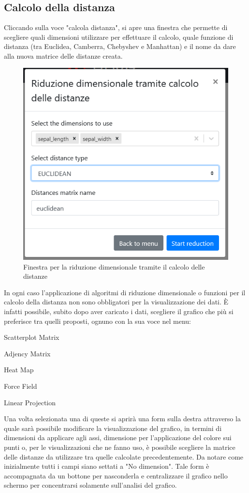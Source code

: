 \subsection{Calcolo della distanza}
Cliccando sulla voce "calcola distanza", si apre una finestra che permette di scegliere quali dimensioni utilizzare per effettuare il calcolo, quale funzione di distanza (tra Euclidea, Camberra, Chebyshev e Manhattan) e il nome da dare alla nuova matrice delle distanze creata.
\begin{figure}[h]
		\includegraphics[scale=0.5]{Images/CalcoloDistanze.png}
		\centering
		\caption{Finestra per la riduzione dimensionale tramite il calcolo delle distanze}
\end{figure}

In ogni caso l'applicazione di algoritmi di riduzione dimensionale o funzioni per il calcolo della distanza non sono obbligatori per la visualizzazione dei dati. È infatti possibile, subito dopo aver caricato i dati, scegliere il grafico che più si preferisce tra quelli proposti, ognuno con la sua voce nel menu:

Scatterplot Matrix

Adjency Matrix

Heat Map

Force Field

Linear Projection

Una volta selezionata una di queste si aprirà una form sulla destra attraverso la quale sarà possibile modificare la visualizzazione del grafico, in termini di dimensioni da applicare agli assi, dimensione per l'applicazione del colore sui punti o, per le visualizzazioni che ne fanno uso, è possibile scegliere la matrice delle distanze da utilizzare tra quelle calcolate precedentemente. Da notare come inizialmente tutti i campi siano settati a "No dimension".
Tale form è accompagnata da un bottone per nasconderla e centralizzare il grafico nello schermo per concentrarsi solamente sull'analisi del grafico.